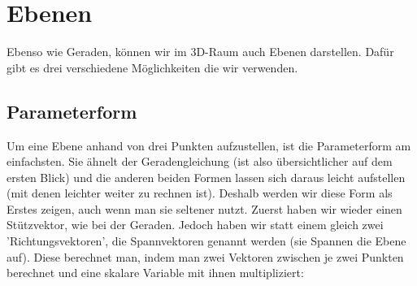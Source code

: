 \section{Ebenen}
	Ebenso wie Geraden, können wir im 3D-Raum auch Ebenen darstellen. Dafür gibt es
	drei verschiedene Möglichkeiten die wir verwenden.

	\subsection{Parameterform}
		Um eine Ebene anhand von drei Punkten aufzustellen, ist die Parameterform am
		einfachsten. Sie ähnelt der Geradengleichung (ist also übersichtlicher auf dem
		ersten Blick) und die anderen beiden Formen lassen sich daraus leicht
		aufstellen (mit denen leichter weiter zu rechnen ist). Deshalb werden wir
		diese Form als Erstes zeigen, auch wenn man sie seltener nutzt. Zuerst haben
		wir wieder einen Stützvektor, wie bei der Geraden. Jedoch haben wir statt
		einem gleich zwei 'Richtungsvektoren', die Spannvektoren genannt werden (sie
		Spannen die Ebene auf). Diese berechnet man, indem man zwei Vektoren zwischen
		je zwei Punkten berechnet und eine skalare Variable mit ihnen multipliziert:
		\formel{\[E:\ \vec{x}=\vec{a}+s\cdot \vec{b}+t\cdot \vec{c}\]}

